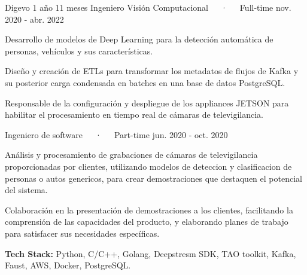 \begin{cventries}
  \cvmultientry
    {Digevo} %
    {1 año 11 meses}
    {Ingeniero Visión Computacional~~~·~~~Full-time} %
    {nov. 2020 - abr. 2022} %
    {
      \begin{cvitems} %
        \item {Desarrollo de modelos de Deep Learning para la detección automática de personas, vehículos y sus características.}
        \item {Diseño y creación de ETLs para transformar los metadatos de flujos de Kafka y su posterior carga condensada en batches en una base de datos PostgreSQL.}
        \item {Responsable de la configuración y despliegue de los appliances JETSON para habilitar el procesamiento en tiempo real de cámaras de televigilancia.}
      \end{cvitems}
    }
    {Ingeniero de software~~~·~~~Part-time} %
    {jun. 2020 - oct. 2020} %
    {
      \begin{cvitems} %
        \item {Análisis y procesamiento de grabaciones de cámaras de televigilancia proporcionadas por clientes, utilizando modelos
        de deteccion y clasificacion de personas o autos genericos, para crear demostraciones que destaquen el potencial del sistema.}
        \item {Colaboración en la presentación de demostraciones a los clientes, facilitando la comprensión de las capacidades del
        producto, y elaborando planes de trabajo para satisfacer sus necesidades específicas.}
      \end{cvitems}
    }
    {
      \begin{cvitems} %
            \item {\textbf{Tech Stack:} Python, C/C++, Golang, Deepstresm SDK, TAO toolkit, Kafka, Faust, AWS, Docker, PostgreSQL.}
      \end{cvitems}
    }

\end{cventries}



    


